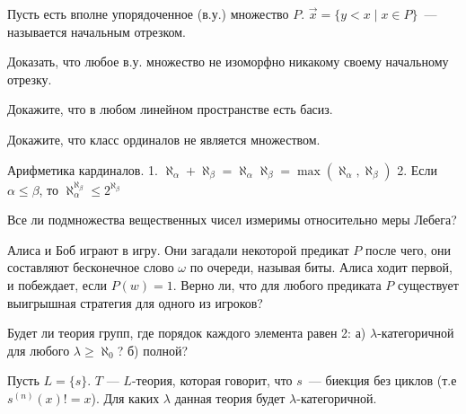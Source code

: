 \setcounter{curtask}{6}


Пусть есть вполне упорядоченное (в.у.) множество $P$.
$\vec{x} = \{y < x \mid x \in P\}$~--- называется начальным отрезком.

\begin{task}
    Доказать, что любое в.у. множество не изоморфно никакому своему начальному отрезку.
\end{task}

\begin{task}
    Докажите, что в любом линейном пространстве есть басиз.
\end{task}

\begin{task}
    Докажите, что класс ординалов не является множеством.
\end{task}

\begin{task}
    Арифметика кардиналов.
    1. $\aleph_{\alpha} + \aleph_{\beta} = \aleph_{\alpha}  \aleph_{\beta} =
    	\max(\aleph_{\alpha}, \aleph_{\beta})$
    2. Если $\alpha \le \beta$, то $\aleph_{\alpha}^{\aleph_{\beta}} \le 2^{\aleph_{\beta}}$
\end{task}

\begin{task}
    Все ли подмножества вещественных чисел измеримы относительно меры Лебега?
\end{task}

\begin{task}
    Алиса и Боб играют в игру. Они загадали некоторой предикат $P$ после чего, они
    составляют бесконечное слово $\omega$ по очереди, называя биты. Алиса ходит
    первой, и побеждает, если $P(w) = 1$. Верно ли, что для любого предиката $P$
    существует выигрышная стратегия для одного из игроков?
\end{task}

\begin{task}
    Будет ли теория групп, где порядок каждого элемента равен 2:
    а) $\lambda$-категоричной для любого $\lambda \ge \aleph_0$?
    б) полной?
\end{task}

\begin{task}
    Пусть $L = \{s\}$. $T$ --- $L$-теория, которая говорит, что $s$~--- биекция без
	циклов (т.е $s^{(n)}(x) != x$). Для каких $\lambda$ данная теория будет
    $\lambda$-категоричной.
\end{task}



